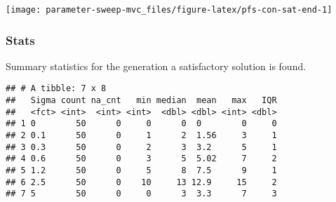 \documentclass[]{book}
\newenvironment{Shaded}{\begin{snugshade}}{\end{snugshade}}
\newcommand{\DataTypeTok}[1]{\textcolor[rgb]{0.13,0.29,0.53}{#1}}
\newcommand{\DecValTok}[1]{\textcolor[rgb]{0.00,0.00,0.81}{#1}}
\newcommand{\KeywordTok}[1]{\textcolor[rgb]{0.13,0.29,0.53}{\textbf{#1}}}
\newcommand{\NormalTok}[1]{#1}
\newcommand{\OperatorTok}[1]{\textcolor[rgb]{0.81,0.36,0.00}{\textbf{#1}}}
\newcommand{\OtherTok}[1]{\textcolor[rgb]{0.56,0.35,0.01}{#1}}
\newcommand{\StringTok}[1]{\textcolor[rgb]{0.31,0.60,0.02}{#1}}
\begin{document}
\texttt{[image: parameter-sweep-mvc\_files/figure-latex/pfs-con-sat-end-1]}

\hypertarget{stats-35}{%
\subsubsection{Stats}\label{stats-35}}

Summary statistics for the generation a satisfactory solution is found.

\begin{Shaded}
\end{Shaded}

\begin{verbatim}
## # A tibble: 7 x 8
##   Sigma count na_cnt   min median  mean   max   IQR
##   <fct> <int>  <int> <int>  <dbl> <dbl> <int> <dbl>
## 1 0        50      0     0      0  0        0     0
## 2 0.1      50      0     1      2  1.56     3     1
## 3 0.3      50      0     2      3  3.2      5     1
## 4 0.6      50      0     3      5  5.02     7     2
## 5 1.2      50      0     5      8  7.5      9     1
## 6 2.5      50      0    10     13 12.9     15     2
## 7 5        50      0     0      3  3.3      7     3
\end{verbatim}
\end{document}
